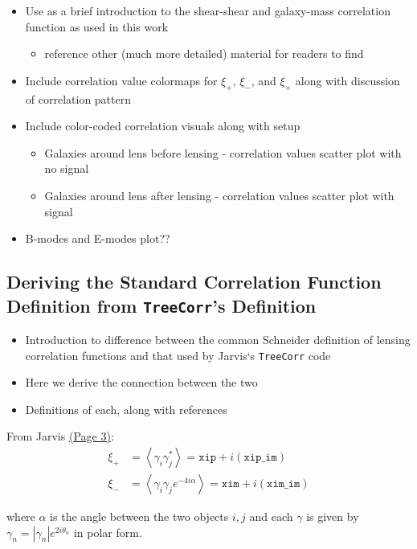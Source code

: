 \documentclass[%
 reprint,
 amsmath,amssymb,
 aps,nofootinbib
]{revtex4-1}
\begin{document}
\begin{itemize}
\item Use as a brief introduction to the shear-shear and galaxy-mass correlation function as used in this work
    \begin{itemize}
    \item reference other (much more detailed) material for readers to find
    \end{itemize}
\item Include correlation value colormaps for $\xi_+$, $\xi_-$, and $\xi_\times$ along with discussion of correlation pattern
\item Include color-coded correlation visuals along with setup
    \begin{itemize}
    \item Galaxies around lens before lensing - correlation values scatter plot with no signal
    \item Galaxies around lens after lensing - correlation values scatter plot with signal
    \end{itemize}
\item B-modes and E-modes plot??
\end{itemize}

\subsection{Deriving the Standard Correlation Function Definition from \texttt{TreeCorr}'s Definition}

\begin{itemize}
\item Introduction to difference between the common Schneider definition of lensing correlation functions and that used by Jarvis`s \texttt{TreeCorr} code
\item Here we derive the connection between the two
\item Definitions of each, along with references
\end{itemize}

From Jarvis \href{http://arxiv.org/pdf/astro-ph/0307393v2.pdf}{(Page 3)}:
\begin{align}
\xi_+&=\left<\gamma_i\gamma_j^*\right>=\texttt{xip}+i(\texttt{xip\_im})\label{s+}\\
\xi_-&=\left<\gamma_i\gamma_je^{-4i\alpha}\right>=\texttt{xim}+i(\texttt{xim\_im})\label{s-}
\end{align}

where $\alpha$ is the angle between the two objects $i,j$ and each $\gamma$ is given by $\gamma_n=|\gamma_n|e^{2i\theta_n}$ in polar form.\\
\end{document}
